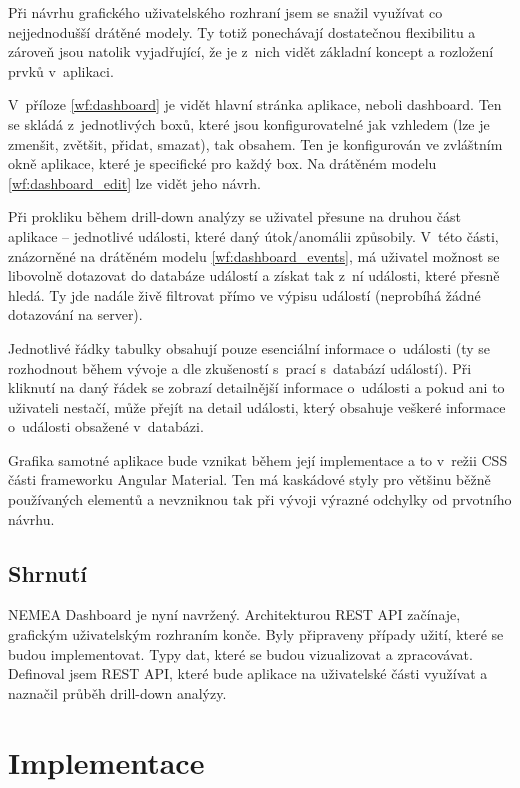
Při návrhu grafického uživatelského rozhraní jsem se snažil využívat co nejjednodušší drátěné modely. Ty totiž ponechávají dostatečnou flexibilitu a zároveň jsou natolik vyjadřující, že je z~nich vidět základní koncept a rozložení prvků v~aplikaci.

V~příloze \ref{wf:dashboard} je vidět hlavní stránka aplikace, neboli dashboard. Ten se skládá z~jednotlivých boxů, které jsou konfigurovatelné jak vzhledem (lze je zmenšit, zvětšit, přidat, smazat), tak obsahem. Ten je konfigurován ve zvláštním okně aplikace, které je specifické pro každý box. Na drátěném modelu \ref{wf:dashboard_edit} lze vidět jeho návrh.

Při prokliku během drill-down analýzy se uživatel přesune na druhou část aplikace -- jednotlivé události, které daný útok/anomálii způsobily. V~této části, znázorněné na drátěném modelu \ref{wf:dashboard_events}, má uživatel možnost se libovolně dotazovat do databáze událostí a získat tak z~ní události, které přesně hledá. Ty jde nadále živě filtrovat přímo ve výpisu událostí (neprobíhá žádné dotazování na server).

Jednotlivé řádky tabulky obsahují pouze esenciální informace o~události (ty se rozhodnout během vývoje a dle zkušeností s~prací s~databází událostí). Při kliknutí na daný řádek se zobrazí detailnější informace o~události a pokud ani to uživateli nestačí, může přejít na detail události, který obsahuje veškeré informace o~události obsažené v~databázi.

Grafika samotné aplikace bude vznikat během její implementace a to v~režii CSS části frameworku Angular Material. Ten má kaskádové styly pro většinu běžně používaných elementů a nevzniknou tak při vývoji výrazné odchylky od prvotního návrhu.

\section{Shrnutí}

NEMEA Dashboard je nyní navržený. Architekturou REST API začínaje, grafickým uživatelským rozhraním konče. Byly připraveny případy užití, které se budou implementovat. Typy dat, které se budou vizualizovat a zpracovávat. Definoval jsem REST API, které bude aplikace na uživatelské části využívat a naznačil průběh drill-down analýzy.

\chapter{Implementace}

